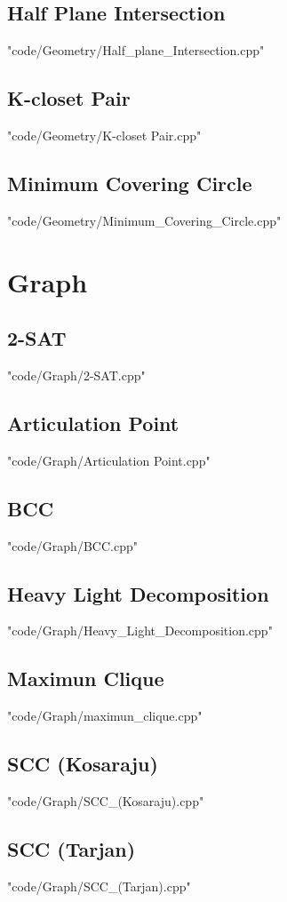 \documentclass [landscape,8pt,a4paper,twocolumn]{article}
\begin{document}
\subsection{Half Plane Intersection}
 {"code/Geometry/Half_plane_Intersection.cpp"}
\subsection{K-closet Pair}
 {"code/Geometry/K-closet Pair.cpp"}
\subsection{Minimum Covering Circle}
 {"code/Geometry/Minimum_Covering_Circle.cpp"}
\section{Graph}
\subsection{2-SAT}
 {"code/Graph/2-SAT.cpp"}
\subsection{Articulation Point}
 {"code/Graph/Articulation Point.cpp"}
\subsection{BCC}
 {"code/Graph/BCC.cpp"}
\subsection{Heavy Light Decomposition}
 {"code/Graph/Heavy_Light_Decomposition.cpp"}
\subsection{Maximun Clique}
 {"code/Graph/maximun_clique.cpp"}
\subsection{SCC (Kosaraju)}
 {"code/Graph/SCC_(Kosaraju).cpp"}
\subsection{SCC (Tarjan)}
 {"code/Graph/SCC_(Tarjan).cpp"}
\end{document}
